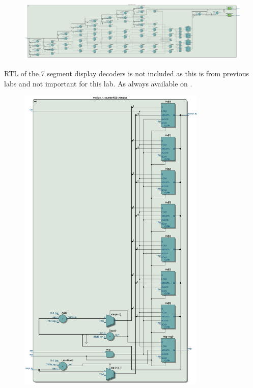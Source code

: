 \documentclass{article}
\begin{document}
\hfill

\begin{figure}[h]
    \centering
    \includegraphics[width=1\textwidth]{Figures/Part2_RTL_BCD_display.jpg}
    \label{fig:p2_RTL_BCD}
\end{figure}

RTL of the 7 segment display decoders is not included as this is from previous labs and not important for this lab. As always available on .

\clearpage
\begin{figure}[h]
    \centering
    \includegraphics[width=0.8\textwidth]{Figures/Part2_RTL_minute_counter.jpg}
    \label{fig:p2_RTL_Counter}
\end{figure}
\end{document}
